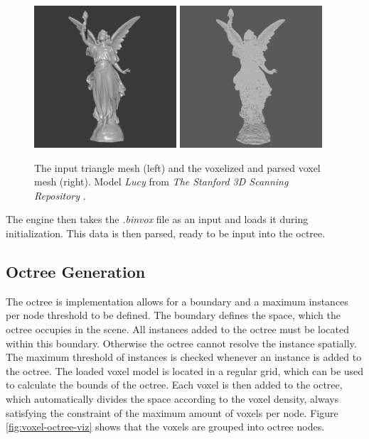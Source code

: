 \begin{figure}[h]
    \centering
    \includegraphics[width=200px]{images/graphics/lucy-triangle-mesh.png}
    \includegraphics[width=200px]{images/graphics/lucy-voxel-mesh.png}
    \caption{The input triangle mesh (left) and the voxelized and parsed voxel mesh (right). 
    Model \emph{Lucy} from \emph{The Stanford 3D Scanning Repository} \cite{Stanford23}.}
    \label{fig:trimesh-to-voxel-mesh}
\end{figure}

\noindent
The engine then takes the \emph{.binvox} file as an input and loads it during initialization. This data is then
parsed, ready to be input into the octree.


\subsection*{Octree Generation}

The octree is implementation allows for a boundary and a maximum instances per node threshold to be defined. 
The boundary defines the space, which the octree occupies in the scene. All instances added to the octree must 
be located within this boundary. Otherwise the octree cannot resolve the instance spatially. The maximum threshold 
of instances is checked whenever an instance is added to the octree. The loaded voxel model is located in a regular 
grid, which can be used to calculate the bounds of the octree. Each voxel is then added to the octree, which 
automatically divides the space according to the voxel density, always satisfying the constraint of the maximum 
amount of voxels per node. Figure \ref{fig:voxel-octree-viz} shows that the voxels are grouped into octree nodes. 



